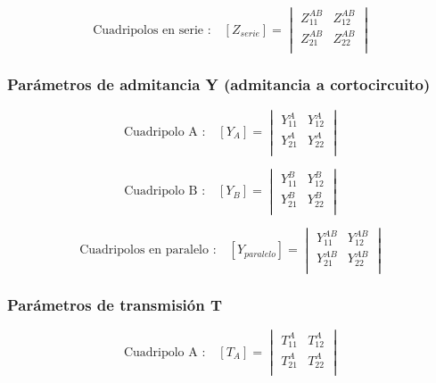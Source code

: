 \documentclass[a4paper]{article}
\begin{document}
\begin{equation}
\text{Cuadripolos en serie :}\quad [Z_{serie}] =
\begin{vmatrix}
	Z^{AB}_{11} & Z^{AB}_{12}\\
	Z^{AB}_{21} & Z^{AB}_{22}\\
\end{vmatrix}
\end{equation}

\subsubsection*{Parámetros de admitancia Y (admitancia a cortocircuito)}

\begin{equation}
\text{Cuadripolo A :}\quad [Y_{A}] =
\begin{vmatrix}
	Y^{A}_{11} & Y^{A}_{12}\\
	Y^{A}_{21} & Y^{A}_{22}\\
\end{vmatrix}
\end{equation}

\begin{equation}
\text{Cuadripolo B :}\quad [Y_{B}] =
\begin{vmatrix}
	Y^{B}_{11} & Y^{B}_{12}\\
	Y^{B}_{21} & Y^{B}_{22}\\
\end{vmatrix}
\end{equation}

\begin{equation}
\text{Cuadripolos en paralelo :}\quad [Y_{paralelo}] =
\begin{vmatrix}
	Y^{AB}_{11} & Y^{AB}_{12}\\
	Y^{AB}_{21} & Y^{AB}_{22}\\
\end{vmatrix}
\end{equation}

\subsubsection*{Parámetros de transmisión T}

\begin{equation}
\text{Cuadripolo A :}\quad [T_{A}] =
\begin{vmatrix}
	T^{A}_{11} & T^{A}_{12}\\
	T^{A}_{21} & T^{A}_{22}\\
\end{vmatrix}
\end{equation}
\end{document}
